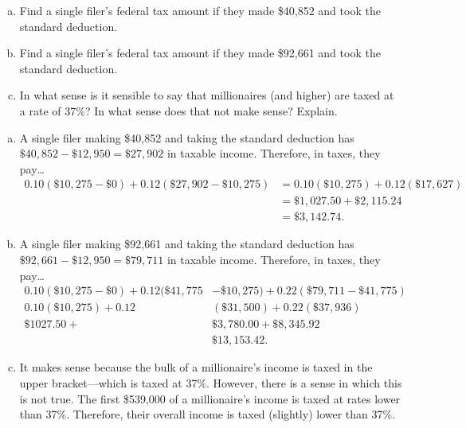 \documentclass[11pt,letterpaper]{article}
\begin{document}
	\begin{enumerate}[(a)]
	\item Find a single filer's federal tax amount if they made \$40,852 and took the standard deduction. 
	\item Find a single filer's federal tax amount if they made \$92,661 and took the standard deduction. 
	\item In what sense is it sensible to say that millionaires (and higher) are taxed at a rate of 37\%? In what sense does that not make sense? Explain.
	\end{enumerate} \pspace

\sol 
\begin{enumerate}[(a)]
\item A single filer making \$40,852 and taking the standard deduction has $\$40,852 - \$12,950= \$27,902$ in taxable income. Therefore, in taxes, they pay\dots
	\[
	\begin{aligned}
	0.10(\$10,275 - \$0) + 0.12(\$27,902 - \$10,275)&= 0.10(\$10,275) + 0.12(\$17,627) \\[0.3cm]
	&= \$1,027.50 + \$2,115.24 \\[0.3cm]
	&= \$3,142.74.
	\end{aligned}
	\] \pspace

\item A single filer making \$92,661 and taking the standard deduction has $\$92,661 - \$12,950= \$79,711$ in taxable income. Therefore, in taxes, they pay\dots
	\[
	\begin{aligned}
	0.10(\$10,275 - \$0) + 0.12(\$41,775 &- \$10,275) + 0.22(\$79,711 - \$41,775) \\[0.3cm]
	0.10(\$10,275) + 0.12&(\$31,500) + 0.22(\$37,936) \\[0.3cm]
	\$1027.50 + &\$3,780.00 + \$8,345.92 \\[0.3cm]
	&\$13,153.42.
	\end{aligned}
	\] \pspace

\item It makes sense because the bulk of a millionaire's income is taxed in the upper bracket---which is taxed at 37\%. However, there is a sense in which this is not true. The first \$539,000 of a millionaire's income is taxed at rates lower than 37\%. Therefore, their overall income is taxed (slightly) lower than 37\%.
\end{enumerate}



\newpage
\end{document}
